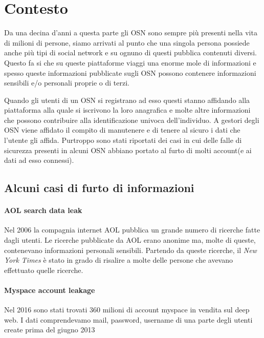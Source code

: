 \section{Contesto}
Da una decina d'anni a questa parte gli OSN sono sempre più presenti nella vita di milioni di persone, siamo arrivati al punto che una singola persona possiede anche più tipi di social network e su ognuno di questi pubblica contenuti diversi. Questo fa si che su queste piattaforme viaggi una enorme mole di informazioni e spesso queste informazioni pubblicate sugli OSN possono contenere informazioni sensibili e/o personali proprie o di terzi. 

Quando gli utenti di un OSN si registrano ad esso questi stanno affidando alla piattaforma alla quale si iscrivono la loro anagrafica e molte altre informazioni che possono contribuire alla identificazione univoca dell'individuo. A gestori degli OSN viene affidato il compito di manutenere e di tenere al sicuro i dati che l'utente gli affida. Purtroppo sono stati riportati dei casi in cui delle falle di sicurezza presenti in alcuni OSN abbiano portato al furto di molti account(e ai dati ad esso connessi).

\subsection{Alcuni casi di furto di informazioni}
\paragraph{AOL search data leak}\cite{aolDataLeak}
Nel 2006 la compagnia internet AOL pubblica un grande numero di ricerche fatte dagli utenti. Le ricerche pubblicate da AOL erano anonime ma, molte di queste, contenevano informazioni personali sensibili.
Partendo da queste ricerche, il \textit{New York Times} è stato in grado di risalire a molte delle persone che avevano effettuato quelle ricerche.

\paragraph{Myspace account leakage}\cite{myspacebreach}
Nel 2016 sono stati trovati 360 milioni di account myspace in vendita sul deep web. I dati comprendevamo mail, password, username di una parte degli utenti create prima del giugno 2013


